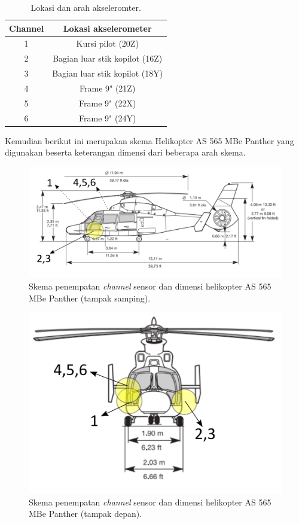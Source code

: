 \begin{longtable}{|c|c|}
	\caption{Lokasi dan arah akseleromter.}
	\label{tb:lokasiakselero}                        	\\
	\hline
	\textbf{Channel} & \textbf{Lokasi akselerometer} 	\\
	\hline
	1            	 & Kursi pilot (20Z)             	\\
	\hline
	2			     & Bagian luar stik kopilot (16Z)   \\
	\hline
	3				 & Bagian luar stik kopilot	(18Y)   \\
	\hline
	4				 & Frame 9" (21Z)                   \\
	\hline
	5				 & Frame 9" (22X)					\\
	\hline
	6				 & Frame 9" (24Y)					\\
	\hline
\end{longtable}

Kemudian berikut ini merupakan skema Helikopter AS 565 MBe Panther yang digunakan beserta keterangan dimensi dari beberapa arah skema.

\begin{figure}[H]
	\centering
	\includegraphics[width=0.8\linewidth]{gambar/tampak_samping.png}
	\caption{Skema penempatan \textit{channel} sensor dan dimensi helikopter AS 565 MBe Panther (tampak samping).}
	\label{tampak_samping.png}
\end{figure}

\begin{figure}[H]
	\centering
	\includegraphics[width=0.6\linewidth]{gambar/tampak_depan.png}
	\caption{Skema penempatan \textit{channel} sensor dan dimensi helikopter AS 565 MBe Panther (tampak depan).}
	\label{tampak_depan.png}
\end{figure}

